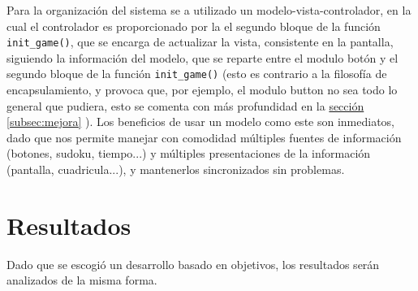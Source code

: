 \documentclass[12pt,letterpaper]{article}
\newcommand*{\iref}[2]{
  \hyperref[#1]{#2
  \ref*{#1}}
  }
\begin{document}
Para la organización del sistema se a utilizado un
modelo-vista-controlador, en la cual el controlador es proporcionado
por la el segundo bloque de la función \texttt{init\_game()}, que se
encarga de actualizar la vista, consistente en la pantalla, siguiendo
la información del modelo, que se reparte entre el modulo botón y el
segundo bloque de la función \texttt{init\_game()} (esto es contrario
a la filosofía de encapsulamiento, y provoca que, por ejemplo, el
modulo button no sea todo lo general que pudiera, esto se comenta con
más profundidad en la \iref{subsec:mejora}{sección}). Los beneficios
de usar un modelo como este son inmediatos, dado que nos permite
manejar con comodidad múltiples fuentes de información (botones,
sudoku, tiempo...) y múltiples presentaciones de la información
(pantalla, cuadricula...), y mantenerlos sincronizados sin problemas.


\section{Resultados}
\label{sec:resultados}

Dado que se escogió un desarrollo basado en objetivos, los resultados
serán analizados de la misma forma.
\end{document}
